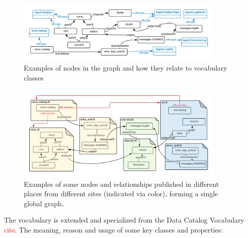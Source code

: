 \begin{figure}
\includegraphics[width=0.9\textwidth]{logset-classes-nodes.png}
\caption{Examples of nodes in the graph and how they relate to
vocabulary classes}
\label{f:logset-classes-nodes}
\end{figure}

\begin{figure}
\includegraphics[width=0.9\textwidth]{logset-example.png}
\caption{Examples of some nodes and relationships published in different places 
from different sites (indicated via color), forming a single global graph. }
\label{f:logset-example}
\end{figure}

The vocabulary is extended and specialized 
from the Data Catalog Vocabulary \textcolor{red}{cite}. The meaning, 
reason and usage of some key classes and properties:

